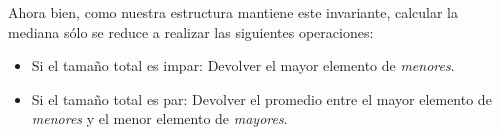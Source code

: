 Ahora bien, como nuestra estructura mantiene este invariante, calcular la mediana s\'olo se reduce a realizar las siguientes operaciones:
\begin{itemize}
	\item Si el tama\~no total es impar: Devolver el mayor elemento de \textit{menores}.
	\item Si el tama\~no total es par: Devolver el promedio entre el mayor elemento de \textit{menores} y el menor elemento de \textit{mayores}.
\end{itemize}
